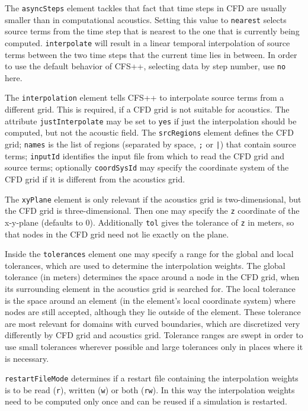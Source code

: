 The \texttt{asyncSteps} element tackles that fact that time steps in CFD are
usually smaller than in computational acoustics. Setting this value to
\texttt{nearest} selects source terms from the time step that is nearest to the
one that is currently being computed. \texttt{interpolate} will result in a
linear temporal interpolation of source terms between the two time steps that
the current time lies in between. In order to use the default behavior of
CFS++, selecting data by step number, use \texttt{no} here.

The \texttt{interpolation} element tells CFS++ to interpolate source terms from
a different grid. This is required, if a CFD grid is not suitable for
acoustics. The attribute \texttt{justInterpolate} may be set to \texttt{yes} if
just the interpolation should be computed, but not the acoustic field. The
\texttt{srcRegions} element defines the CFD grid; \texttt{names} is the list
of regions (separated by space, \verb|;| or \verb#|#) that contain
source terms; \texttt{inputId} identifies the input file from which to read the
CFD grid and source terms; optionally \texttt{coordSysId} may specify the
coordinate system of the CFD grid if it is different from the acoustics grid.

The \texttt{xyPlane} element is only relevant if the acoustics grid is
two-dimensional, but the CFD grid is three-dimensional. Then one may specify
the \texttt{z} coordinate of the x-y-plane (defaults to 0). Additionally
\texttt{tol} gives the tolerance of \texttt{z} in meters, so that nodes in the
CFD grid need not lie exactly on the plane.

Inside the \texttt{tolerances} element one may specify a range for the global
and local tolerances, which are used to determine the interpolation weights.
The global tolerance (in meters) determines the space around a node in the CFD
grid, when its surrounding element in the acoustics grid is searched for. The
local tolerance is the space around an element (in the element's local
coordinate system) where nodes are still accepted, although they lie outside of
the element. These tolerance are most relevant for domains with curved
boundaries, which are discretized very differently by CFD grid and acoustics
grid. Tolerance ranges are swept in order to use small tolerances wherever
possible and large tolerances only in places where it is necessary.

\texttt{restartFileMode} determines if a restart file containing the
interpolation weights is to be read (\texttt{r}), written (\texttt{w}) or both
(\texttt{rw}). In this way the interpolation weights need to be computed only
once and can be reused if a simulation is restarted.

